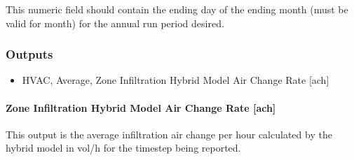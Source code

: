 This numeric field should contain the ending day of the ending month (must be valid for month) for the annual run period desired.

\subsubsection{Outputs}\label{outputs-hm}


\begin{itemize}
\item
  HVAC, Average, Zone Infiltration Hybrid Model Air Change Rate {[ach]}
\end{itemize}

\paragraph{Zone Infiltration Hybrid Model Air Change Rate {[ach]}}\label{hybridmodel-output-infil-ach}

This output is the average infiltration air change per hour calculated by the hybrid model in vol/h for the timestep being reported.